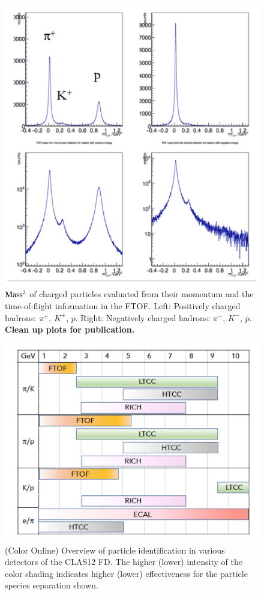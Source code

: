 \documentclass[final,3p,twocolumn]{elsarticle}
\begin{document}
\begin{figure}[htbp!]
\centerline{\includegraphics[width=1.0\columnwidth]{pid-1d.png}}
\caption{{$\rm Mass^2$} of charged particles evaluated from their momentum and the time-of-flight information
in the FTOF. Left: Positively charged hadrons: $\pi^+$, $K^+$, $p$. Right: Negatively charged hadrons: $\pi^-$,
$K^-$, ${\bar{p}}$. {\bf Clean up plots for publication.}}
\label{pid-1D}
\end{figure} 

\begin{figure}[htbp!]
\centerline{\includegraphics[width=1.1\columnwidth]{CLAS12-pid.png}}
\caption{(Color Online) Overview of particle identification in various detectors of the CLAS12 FD. The higher (lower) intensity
of the color shading indicates higher (lower) effectiveness for the particle species separation shown.} 
\label{pid1}
\end{figure} 
\end{document}
